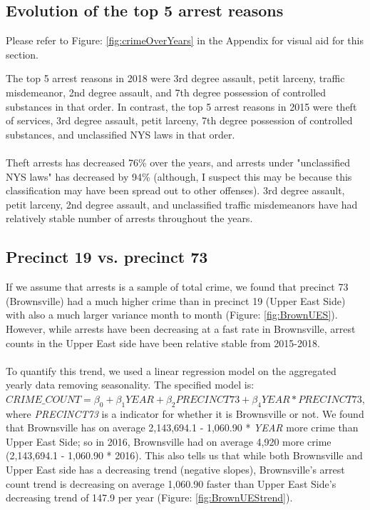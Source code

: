 \documentclass[11pt]{article}\usepackage[]{graphicx}\usepackage[]{color}
\begin{document}
\subsection{Evolution of the top 5 arrest reasons}
Please refer to Figure: \ref{fig:crimeOverYears} in the Appendix for visual aid for this section.

The top 5 arrest reasons in 2018 were 3rd degree assault, petit larceny, traffic misdemeanor, 2nd degree assault, and 7th degree possession of controlled substances in that order. In contrast, the top 5 arrest reasons in 2015 were theft of services, 3rd degree assault, petit larceny, 7th degree possession of controlled substances, and unclassified NYS laws in that order.
\\\\
Theft arrests has decreased 76\% over the years, and arrests under "unclassified NYS laws" has decreased by 94\% (although, I suspect this may be because this classification may have been spread out to other offenses). 3rd degree assault, petit larceny, 2nd degree assault, and unclassified traffic misdemeanors have had relatively stable number of arrests throughout the years. 

\subsection{Precinct 19 vs. precinct 73}
If we assume that arrests is a sample of total crime, we found that precinct 73 (Brownsville) had a much higher crime than in precinct 19 (Upper East Side) with also a much larger variance month to month (Figure: \ref{fig:BrownUES}). However, while arrests have been decreasing at a fast rate in Brownsville, arrest counts in the Upper East side have been relative stable from 2015-2018. 
\\\\
To quantify this trend, we used a linear regression model on the aggregated yearly data removing seasonality. The specified model is: $CRIME\_COUNT = \beta_0 + \beta_1YEAR + \beta_2PRECINCT73 +\beta_4YEAR*PRECINCT73$, where \textit{PRECINCT73} is a indicator for whether it is Brownsville or not. We found that Brownsville has on average 2,143,694.1 - 1,060.90 * \textit{YEAR} more crime than Upper East Side; so in 2016, Brownsville had on average 4,920 more crime (2,143,694.1 - 1,060.90 * 2016). This also tells us that while both Brownsville and Upper East side has a decreasing trend (negative slopes), Brownsville's arrest count trend is decreasing on average 1,060.90 faster than Upper East Side's decreasing trend of 147.9 per year (Figure: \ref{fig:BrownUEStrend}).
\end{document}
